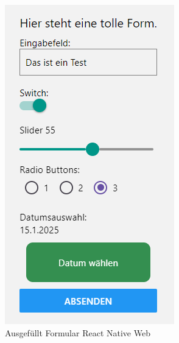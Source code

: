\begin{figure}[H]
\begin{minipage}{0.45\textwidth}
        \includegraphics[width=\linewidth]{images/form/web/react_native/formCompleted.png}
        \caption{Ausgefüllt Formular React Native Web}
    \end{minipage}
\end{figure}